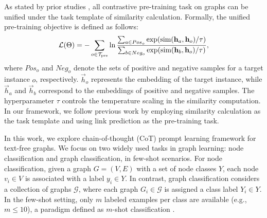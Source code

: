 As stated by prior studies \cite{yu2024generalized,yu2024non}, all contrastive pre-training task on graphs \cite{liu2023graphprompt,velickovic2019deep,you2020graph} can be unified under the task template of similarity calculation.
Formally, the unified pre-training objective is defined as follows:
\begin{equation}\label{eq:generalized_loss}
     \mathcal{L}(\Theta)= -\sum_{o\in \mathcal{T}_\text{pre}}\ln\frac{\sum_{a\in Pos_o}\exp(\text{sim}(\mathbf{h}_{a}, \mathbf{h}_{o})/\tau)}{\sum_{b\in Neg_o}\exp(\text{sim}(\mathbf{h}_{b}, \mathbf{h}_{o})/\tau)},
\end{equation}
where \( Pos_o \) and \( Neg_o \) denote the sets of positive and negative samples for a target instance \( o \), respectively. \( \vec{h}_o \) represents the embedding of the target instance, while \( \vec{h}_a \) and \( \vec{h}_b \) correspond to the embeddings of positive and negative samples. The hyperparameter \( \tau \) controls the temperature scaling in the similarity computation. In our framework, we follow previous work \cite{liu2023graphprompt,yu2024generalized} by employing similarity calculation as the task template and using link prediction as the pre-training task.

In this work, we explore chain-of-thought (CoT) prompt learning framework for text-free graphs. We focus on two widely used tasks in graph learning: node classification and graph classification, in few-shot scenarios.
For node classification, given a graph \( G = (V, E) \) with a set of node classes \( Y \), each node \( v_i \in V \) is associated with a label \( y_i \in Y \). In contrast, graph classification considers a collection of graphs \( \mathcal{G} \), where each graph \( G_i \in \mathcal{G} \) is assigned a class label \( Y_i \in Y \).
In the few-shot setting, only \( m \) labeled examples per class are available (e.g., \( m \leq 10 \)), a paradigm defined as \( m \)-shot classification \cite{liu2023graphprompt,yu2024generalized}.
